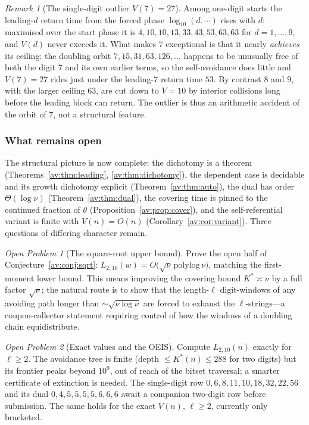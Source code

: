 \documentclass[a4paper]{article}
\theoremstyle{plain}
\theoremstyle{definition}
\theoremstyle{remark}
\newtheorem{remark}{Remark}[subsection]
\newtheorem{openproblem}{Open Problem}[subsection]
\newcommand{\Lbb}[1][b,B]{L_{#1}}
\begin{document}
\begin{remark}[The single-digit outlier $V(7)=27$]
Among one-digit starts the leading-$d$ return time from the forced phase $\log_{10}(d{.}\,\cdots)$ rises with $d$: maximised over the start phase it is $4,10,10,13,33,43,53,63,63$ for $d=1,\dots,9$, and $V(d)$ never exceeds it. What makes $7$ exceptional is that it nearly \emph{achieves} its ceiling: the doubling orbit $7,15,31,63,126,\dots$ happens to be unusually free of both the digit $7$ and its own earlier terms, so the self-avoidance does little and $V(7)=27$ rides just under the leading-$7$ return time $53$. By contrast $8$ and $9$, with the larger ceiling $63$, are cut down to $V=10$ by interior collisions long before the leading block can return. The outlier is thus an arithmetic accident of the orbit of $7$, not a structural feature.
\end{remark}

\subsubsection{What remains open}

The structural picture is now complete: the dichotomy is a theorem (Theorems~\ref{av:thm:leading}, \ref{av:thm:dichotomy}), the dependent case is decidable and its growth dichotomy explicit (Theorem~\ref{av:thm:auto}), the dual has order $\Theta(\log\nu)$ (Theorem~\ref{av:thm:dual}), the covering time is pinned to the continued fraction of $\theta$ (Proposition~\ref{av:prop:cover}), and the self-referential variant is finite with $V(n)=O(n)$ (Corollary~\ref{av:cor:variant}). Three questions of differing character remain.

\begin{openproblem}[The square-root upper bound]
Prove the open half of Conjecture~\ref{av:conj:sqrt}: $\Lbb[2,10](w)=O\!\bigl(\sqrt\nu\,\mathrm{polylog}\,\nu\bigr)$, matching the first-moment lower bound. This means improving the covering bound $K^{*}\asymp\nu$ by a full factor $\sqrt\nu$; the natural route is to show that the length-$\ell$ digit-windows of any avoiding path longer than $\sim\sqrt{\nu\log\nu}$ are forced to exhaust the $\ell$-strings---a coupon-collector statement requiring control of how the windows of a doubling chain equidistribute.
\end{openproblem}

\begin{openproblem}[Exact values and the OEIS]
Compute $\Lbb[2,10](n)$ exactly for $\ell\ge2$. The avoidance tree is finite (depth $\le K^{*}(n)\le 288$ for two digits) but its frontier peaks beyond $10^{9}$, out of reach of the bitset traversal; a smarter certificate of extinction is needed. The single-digit row $0,6,8,11,10,18,32,22,56$ and its dual $0,4,5,5,5,5,6,6,6$ await a companion two-digit row before submission. The same holds for the exact $V(n)$, $\ell\ge2$, currently only bracketed.
\end{openproblem}
\end{document}
